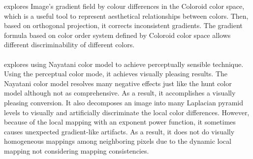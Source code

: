 \documentclass{article}
\begin{document}
\cite{cadik07color_to_gray} explores Image’s gradient field by colour differences in the Coloroid color space, which is a useful tool to represent aesthetical relationships between colors. Then, based on orthogonal projection, it corrects inconsistent gradients. The gradient formula based on color order system defined by Coloroid color space allows different discriminability of different colors. \\\\
\cite{Smith_apparentgreyscale} explores using Nayatani color model to achieve perceptually sensible technique. Using the perceptual color mode, it achieves visually pleasing results. The Nayatani color model resolves many negative effects just like the hunt color model although not as comprehensive. As a result, it accomplishes a visually pleasing conversion. It also decomposes an image into many Laplacian pyramid levels to visually and artificially discriminate the local color differences. However, because of the local mapping with an exponent power function, it sometimes causes unexpected gradient-like artifacts. As a result, it does not do visually homogeneous mappings among neighboring pixels due to the dynamic local mapping not considering mapping consistencies.\\\\
\end{document}
